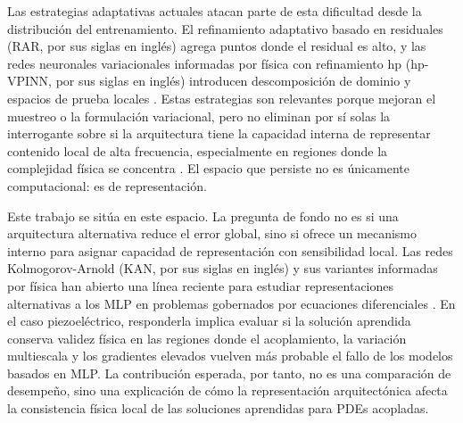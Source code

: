 Las estrategias adaptativas actuales atacan parte de esta dificultad desde la distribución del entrenamiento. El refinamiento adaptativo basado en residuales (RAR, por sus siglas en inglés) agrega puntos donde el residual es alto, y las redes neuronales variacionales informadas por física con refinamiento hp (hp-VPINN, por sus siglas en inglés) introducen descomposición de dominio y espacios de prueba locales \cite{lu2021deepxde,wu2023sampling,kharazmi2021hpvpinns}. Estas estrategias son relevantes porque mejoran el muestreo o la formulación variacional, pero no eliminan por sí solas la interrogante sobre si la arquitectura tiene la capacidad interna de representar contenido local de alta frecuencia, especialmente en regiones donde la complejidad física se concentra \cite{rahaman2019,tancik2020,shukla2024fair}. El espacio que persiste no es únicamente computacional: es de representación.

Este trabajo se sitúa en este espacio. La pregunta de fondo no es si una arquitectura alternativa reduce el error global, sino si ofrece un mecanismo interno para asignar capacidad de representación con sensibilidad local. Las redes Kolmogorov-Arnold (KAN, por sus siglas en inglés) y sus variantes informadas por física han abierto una línea reciente para estudiar representaciones alternativas a los MLP en problemas gobernados por ecuaciones diferenciales \cite{liu2024kan,toscano2025pikans,shukla2024fair,wang2025kinn}. En el caso piezoeléctrico, responderla implica evaluar si la solución aprendida conserva validez física en las regiones donde el acoplamiento, la variación multiescala y los gradientes elevados vuelven más probable el fallo de los modelos basados en MLP. La contribución esperada, por tanto, no es una comparación de desempeño, sino una explicación de cómo la representación arquitectónica afecta la consistencia física local de las soluciones aprendidas para PDEs acopladas.